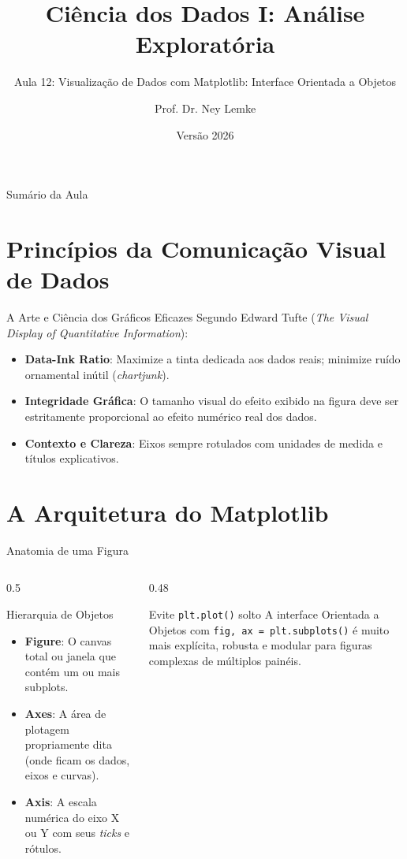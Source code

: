 \documentclass[aspectratio=169, 10pt]{beamer}
\title[Aula 12 - Matplotlib]{Ciência dos Dados I: Análise Exploratória}
\subtitle{Aula 12: Visualização de Dados com Matplotlib: Interface Orientada a Objetos}
\author{Prof. Dr. Ney Lemke}
\institute{UNESP -- Instituto de Biociências de Botucatu}
\date{Versão 2026}
\begin{document}
\frame{\titlepage}

\begin{frame}{Sumário da Aula}
  \tableofcontents
\end{frame}

\section{Princípios da Comunicação Visual de Dados}

\begin{frame}{A Arte e Ciência dos Gráficos Eficazes}
  Segundo Edward Tufte (\textit{The Visual Display of Quantitative Information}):
  \begin{itemize}
    \item \textbf{Data-Ink Ratio}: Maximize a tinta dedicada aos dados reais; minimize ruído ornamental inútil (\textit{chartjunk}).
    \item \textbf{Integridade Gráfica}: O tamanho visual do efeito exibido na figura deve ser estritamente proporcional ao efeito numérico real dos dados.
    \item \textbf{Contexto e Clareza}: Eixos sempre rotulados com unidades de medida e títulos explicativos.
  \end{itemize}
\end{frame}

\section{A Arquitetura do Matplotlib}

\begin{frame}{Anatomia de uma Figura}
  \begin{columns}
    \begin{column}{0.5\textwidth}
      \begin{block}{Hierarquia de Objetos}
        \begin{itemize}
          \item \textbf{Figure}: O canvas total ou janela que contém um ou mais subplots.
          \item \textbf{Axes}: A área de plotagem propriamente dita (onde ficam os dados, eixos e curvas).
          \item \textbf{Axis}: A escala numérica do eixo X ou Y com seus \textit{ticks} e rótulos.
        \end{itemize}
      \end{block}
    \end{column}
    \begin{column}{0.48\textwidth}
      \begin{alertblock}{Evite \texttt{plt.plot()} solto}
        A interface Orientada a Objetos com \texttt{fig, ax = plt.subplots()} é muito mais explícita, robusta e modular para figuras complexas de múltiplos painéis.
      \end{alertblock}
    \end{column}
  \end{columns}
\end{frame}
\end{document}
